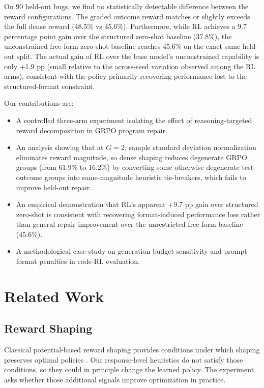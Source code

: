 \documentclass{article}
\begin{document}
On 90 held-out bugs, we find no statistically detectable difference between the reward configurations. The graded outcome reward matches or slightly exceeds the full dense reward (48.5\% vs 45.6\%). Furthermore, while RL achieves a 9.7 percentage point gain over the structured zero-shot baseline (37.8\%), the unconstrained free-form zero-shot baseline reaches 45.6\% on the exact same held-out split. The actual gain of RL over the base model's unconstrained capability is only +1.9 pp (small relative to the across-seed variation observed among the RL arms), consistent with the policy primarily recovering performance lost to the structured-format constraint.

Our contributions are:
\begin{itemize}
\item A controlled three-arm experiment isolating the effect of reasoning-targeted reward decomposition in GRPO program repair.
\item An analysis showing that at $G=2$, sample standard deviation normalization eliminates reward magnitude, so dense shaping reduces degenerate GRPO groups (from 61.9\% to 16.2\%) by converting some otherwise degenerate test-outcome groups into same-magnitude heuristic tie-breakers, which fails to improve held-out repair.
\item An empirical demonstration that RL's apparent +9.7 pp gain over structured zero-shot is consistent with recovering format-induced performance loss rather than general repair improvement over the unrestricted free-form baseline (45.6\%).
\item A methodological case study on generation budget sensitivity and prompt-format penalties in code-RL evaluation.
\end{itemize}

\section{Related Work}

\subsection{Reward Shaping}
Classical potential-based reward shaping provides conditions under which shaping preserves optimal policies \cite{Ng1999}. Our response-level heuristics do not satisfy those conditions, so they could in principle change the learned policy. The experiment asks whether those additional signals improve optimization in practice.
\end{document}
